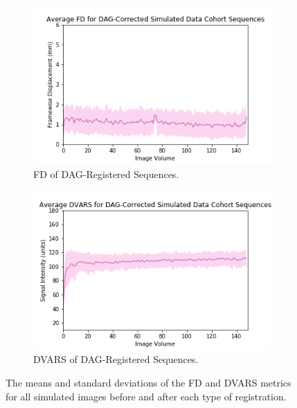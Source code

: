 \begin{figure}[]
	\begin{subfigure}{0.4\textwidth}
		\centering
		\includegraphics[width=1.0\textwidth]{6/figures/spectr-dag-fd-150.png}
		\caption{FD of DAG-Registered Sequences.}
	\end{subfigure}
	\hspace{0.05\textwidth}
	\begin{subfigure}{0.4\textwidth}
		\centering
		\includegraphics[width=1.0\textwidth]{6/figures/spectr-dag-dvars-150.png}
		\caption{DVARS of DAG-Registered Sequences.}
	\end{subfigure}
\caption{The means and standard deviations of the FD and DVARS metrics for all simulated images before and after each type of registration.}
\label{fig:spectr-power-dists}
\end{figure}

